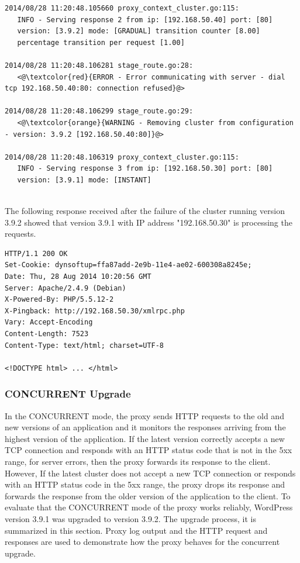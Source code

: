 \documentclass[a4paper,11pt,twoside]{report}
\begin{document}
\begin{lstlisting}[language=terminal]
2014/08/28 11:20:48.105660 proxy_context_cluster.go:115:     
   INFO - Serving response 2 from ip: [192.168.50.40] port: [80] 
   version: [3.9.2] mode: [GRADUAL] transition counter [8.00] 
   percentage transition per request [1.00]
   
2014/08/28 11:20:48.106281 stage_route.go:28:    
   <@\textcolor{red}{ERROR - Error communicating with server - dial tcp 192.168.50.40:80: connection refused}@>

2014/08/28 11:20:48.106299 stage_route.go:29:  
   <@\textcolor{orange}{WARNING - Removing cluster from configuration - version: 3.9.2 [192.168.50.40:80]}@>

2014/08/28 11:20:48.106319 proxy_context_cluster.go:115:     
   INFO - Serving response 3 from ip: [192.168.50.30] port: [80] 
   version: [3.9.1] mode: [INSTANT]
\end{lstlisting}   

\noindent\\
The following response received after the failure of the cluster running version 3.9.2 showed that version 3.9.1 with IP address "192.168.50.30" is processing the requests.\smallskip

\begin{lstlisting}[language=terminal]
HTTP/1.1 200 OK
Set-Cookie: dynsoftup=ffa87add-2e9b-11e4-ae02-600308a8245e;
Date: Thu, 28 Aug 2014 10:20:56 GMT
Server: Apache/2.4.9 (Debian)
X-Powered-By: PHP/5.5.12-2
X-Pingback: http://192.168.50.30/xmlrpc.php
Vary: Accept-Encoding
Content-Length: 7523
Content-Type: text/html; charset=UTF-8
 
<!DOCTYPE html> ... </html>
\end{lstlisting}     

\subsubsection*{CONCURRENT Upgrade}
In the CONCURRENT mode, the proxy sends HTTP requests to the old and new versions of an application and it monitors the responses arriving from the highest version of the application. If the latest version correctly accepts a new TCP connection and responds with an HTTP status code that is not in the 5xx range, for server errors, then the proxy forwards its response to the client. However, If the latest cluster does not accept a new TCP connection or responds with an HTTP status code in the 5xx range, the proxy drops its response and forwards the response from the older version of the application to the client. To evaluate that the CONCURRENT mode of the proxy works reliably, WordPress version 3.9.1 was upgraded to version 3.9.2. The upgrade process, it is summarized in this section. Proxy log output and the HTTP request and responses are used to demonstrate how the proxy behaves for the concurrent upgrade.
\end{document}

